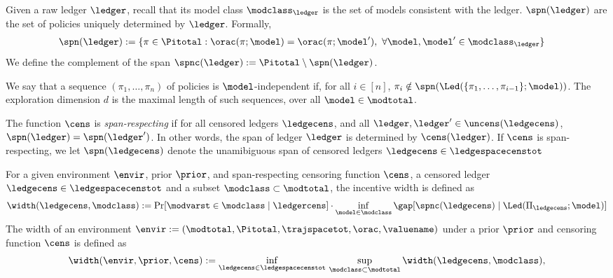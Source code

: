 \begin{definition} 
Given a raw ledger $\ledger$, recall that its model class $\modclass_{\ledger}$ is the set of models consistent with the ledger. $\spn(\ledger)$ are the set of policies uniquely determined by $\ledger$. Formally,
\begin{align}
   \spn(\ledger) &:= \{\pi \in \Pitotal: \orac(\pi;\model) = \orac(\pi;\model'),~ \forall \model,\model' \in \modclass_{\ledger}  \}
\end{align}
We define the complement of the span $\spnc(\ledger) := \Pitotal\setminus\spn(\ledger)$.
\end{definition}
\begin{definition} We say that a sequence $(\pi_1,\dots,\pi_n)$ of policies is $\model$-independent if, for all $i \in [n]$, $\pi_i \notin \spn(\Led(\{\pi_{1},\dots,\pi_{i-1}\};\model))$. The exploration dimension $d$ is the maximal length of such sequences, over all $\model \in \modtotal$. 
\end{definition}


\begin{definition} The function $\cens$ is \emph{span-respecting} if for all censored ledgers $\ledgecens$, and all $\ledger,\ledger' \in \uncens(\ledgecens)$, $\spn(\ledger) = \spn(\ledger')$. In other words, the span of ledger $\ledger$ is determined by $\cens(\ledger)$. If $\cens$ is span-respecting, we let $\spn(\ledgecens)$ denote the unamibiguous span of censored ledgers $\ledgecens \in \ledgespacecenstot$
\end{definition}

\begin{definition}[Width]\label{def:width} For a given environment $\envir$, prior $\prior$, and span-respecting censoring function $\cens$, a censored ledger $\ledgecens \in \ledgespacecenstot$ and a subset $\modclass\subset \modtotal$, the incentive width is defined as 
\begin{align}
    \width(\ledgecens,\modclass) := \Pr[ \modvarst \in \modclass \mid \ledgercens ] \cdot \inf_{\model \in \modclass } \gap[  \spnc(\ledgecens) \mid  \Led(\Pi_{\ledgecens};\model)]
\end{align}
The width of an environment $\envir := (\modtotal,\Pitotal,\trajspacetot,\orac,\valuename)$ under a prior $\prior$ and censoring function $\cens$ is defined as 
\begin{align}
\width(\envir,\prior,\cens) := \inf_{\ledgecens \in \ledgespacecenstot}\,\sup_{\modclass \subset \modtotal} \width(\ledgecens,\modclass),
\end{align}
\end{definition}

